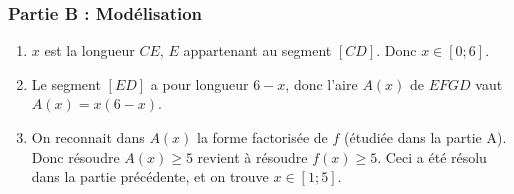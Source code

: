 \documentclass[12pt]{article}
\begin{document}
\begin{exercice}
  \subsubsection*{Partie B : Modélisation}
  \begin{enumerate}
    \item $x$ est la longueur $CE$, $E$ appartenant au segment $[CD]$. Donc
      $x\in\left[0;6\right]$.
    \item Le segment $[ED]$ a pour longueur $6-x$, donc l'aire $A(x)$ de $EFGD$ vaut $A(x)=x(6-x)$.
    \item On reconnait dans $A(x)$ la forme factorisée de $f$ (étudiée dans
      la partie A). Donc résoudre $A(x)\geq5$ revient à résoudre $f(x)\geq5$.
      Ceci a été résolu dans la partie précédente, et on trouve
      $x\in\left[1;5\right]$.
  \end{enumerate}
\end{exercice}

\newpage
\end{document}

